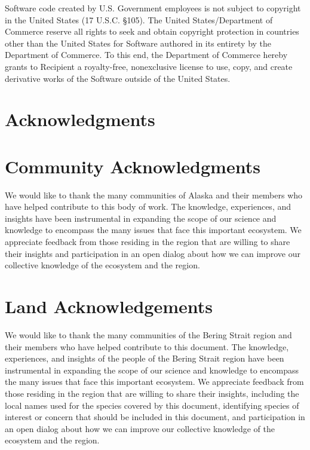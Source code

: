 \documentclass[
  letterpaper,
  oneside,
  open=any]{scrbook}
\begin{document}
Software code created by U.S. Government employees is not subject to
copyright in the United States (17 U.S.C. §105). The United
States/Department of Commerce reserve all rights to seek and obtain
copyright protection in countries other than the United States for
Software authored in its entirety by the Department of Commerce. To this
end, the Department of Commerce hereby grants to Recipient a
royalty-free, nonexclusive license to use, copy, and create derivative
works of the Software outside of the United States.

\chapter{Acknowledgments}\label{acknowledgments}

\chapter{Community Acknowledgments}\label{community-acknowledgments}

We would like to thank the many communities of Alaska and their members
who have helped contribute to this body of work. The knowledge,
experiences, and insights have been instrumental in expanding the scope
of our science and knowledge to encompass the many issues that face this
important ecosystem. We appreciate feedback from those residing in the
region that are willing to share their insights and participation in an
open dialog about how we can improve our collective knowledge of the
ecosystem and the region.

\chapter{Land Acknowledgements}\label{land-acknowledgements}

We would like to thank the many communities of the Bering Strait region
and their members who have helped contribute to this document. The
knowledge, experiences, and insights of the people of the Bering Strait
region have been instrumental in expanding the scope of our science and
knowledge to encompass the many issues that face this important
ecosystem. We appreciate feedback from those residing in the region that
are willing to share their insights, including the local names used for
the species covered by this document, identifying species of interest or
concern that should be included in this document, and participation in
an open dialog about how we can improve our collective knowledge of the
ecosystem and the region.
\end{document}
